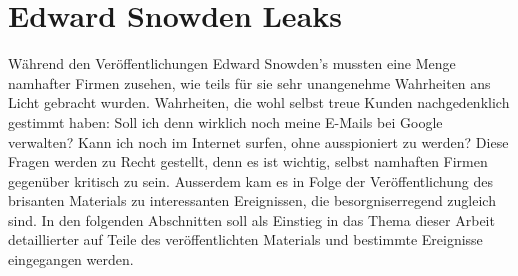 \newpage
\section{Edward Snowden Leaks}
Während den Veröffentlichungen Edward Snowden's mussten eine Menge namhafter Firmen zusehen, wie teils für sie sehr unangenehme Wahrheiten ans Licht gebracht wurden. Wahrheiten, die wohl selbst treue Kunden nachgedenklich gestimmt haben: Soll ich denn wirklich noch meine E-Mails bei Google verwalten? Kann ich noch im Internet surfen, ohne ausspioniert zu werden? Diese Fragen werden zu Recht gestellt, denn es ist wichtig, selbst namhaften Firmen gegenüber kritisch zu sein. Ausserdem kam es in Folge der Veröffentlichung des brisanten Materials zu interessanten Ereignissen, die besorgniserregend zugleich sind. In den folgenden Abschnitten soll als Einstieg in das Thema dieser Arbeit detaillierter auf Teile des veröffentlichten Materials und bestimmte Ereignisse eingegangen werden.

